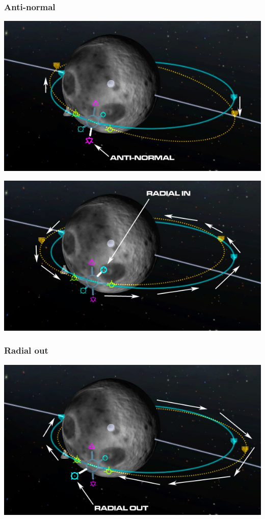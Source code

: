 \begin{frame}
    \frametitle{Anti-normal}
    \begin{center}
        \includegraphics[scale=0.4]{images/anti_normal}
    \end{center}
\end{frame}
\begin{frame}
    \begin{center}
        \includegraphics[scale=0.5]{images/radial_in}
    \end{center}
\end{frame}
\begin{frame}
    \frametitle{Radial out}
    \begin{center}
        \includegraphics[scale=0.5]{images/radial_out}
    \end{center}
\end{frame}
